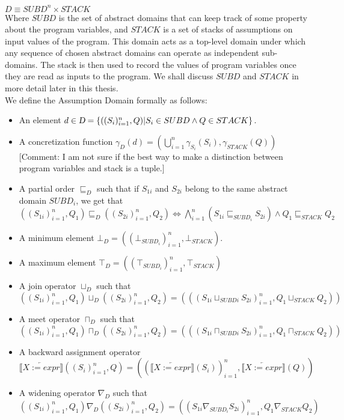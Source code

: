 \documentclass[]{article}
\begin{document}
$D \equiv SUBD^{n} \times STACK$\\	

Where  $SUBD$ is the set of abstract domains that can keep track of some property about the program variables, and $STACK$ is a set of stacks of assumptions on input values of the program. This domain acts as a top-level domain under which any sequence of chosen abstract domains can operate as independent sub-domains. The stack is then used to record the values of program variables once they are read as inputs to the program. We shall discuss $SUBD$ and $STACK$ in more detail later in this thesis. \\

We define the Assumption Domain formally as follows: \\
\begin{itemize}
	\item An element $d \in \textsl{D} = \lbrace ((S_{i})_{i=1}^{n}, Q) \vert S_{i} \in SUBD \wedge Q \in STACK \rbrace$. 
	\item A concretization function $\gamma_{D}(d) =( \bigcup\limits_{i=1}^{n}\gamma_{S_{i}}(S_{i}), \gamma_{STACK}(Q))$ 
	[Comment: I am not sure if the best way to make a distinction between program variables and stack is a tuple.]
	\item A partial order $\sqsubseteq_{D}$ such that if $S_{1i}$ and $S_{2i}$ belong to the same abstract domain $SUBD_{i}$, we get that $ ((S_{1i})_{i=1}^{n}, Q_{1}) \sqsubseteq_{D} ((S_{2 i})_{i=1}^{n}, Q_{2}) \Longleftrightarrow \bigwedge\limits_{i=1}^{n}(S_{1i} \sqsubseteq_{SUBD_{i}} S_{2i}) \wedge Q_{1} \sqsubseteq_{STACK} Q_{2} $
	\item A minimum element $\bot_{D} = ((\bot_{SUBD_{i}})_{i=1}^{n}, \bot_{STACK})$. 
	\item A maximum element $\top_{D} =  ((\top_{SUBD_{i}})_{i=1}^{n}, \top_{STACK})$
	\item A join operator $\sqcup_{D}$ such that $ ((S_{1i})_{i=1}^{n}, Q_{1}) \sqcup_{D} ((S_{2i})_{i=1}^{n}, Q_{2}) = (((S_{1i} \sqcup_{SUBD{i}} S_{2i})_{i=1}^{n}, Q_{1} \sqcup_{STACK} Q_{2}))$
	\item A meet operator $\sqcap_{D}$ such that $ ((S_{1i})_{i=1}^{n}, Q_{1}) \sqcap_{D} ((S_{2i})_{i=1}^{n}, Q_{2}) = (((S_{1i} \sqcap_{SUBD{i}} S_{2i})_{i=1}^{n}, Q_{1} \sqcap_{STACK} Q_{2}))$
	\item A backward assignment operator $\llbracket \overleftarrow{X:= expr} \rrbracket ((S_{i})_{i=1}^{n}, Q) =  ((\llbracket \overleftarrow{X:= expr} \rrbracket(S_{i}))_{i=1}^{n}, \llbracket \overleftarrow{X:= expr} \rrbracket(Q))$ 
	\item A widening operator $\nabla_{D}$ such that $ ((S_{1i})_{i=1}^{n}, Q_{1}) \nabla_{D} ((S_{2i})_{i=1}^{n}, Q_{2}) = ((S_{1i} \nabla_{SUBD_{i}} S_{2i})_{i=1}^{n}, Q_{1} \nabla_{STACK} Q_{2}) $
\end{itemize}
\end{document}
